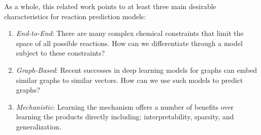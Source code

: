 As a whole, this related work points to at least three main desirable characteristics for reaction prediction models: 
\begin{enumerate}
\item \emph{End-to-End}: There are many complex chemical constraints that limit the space of all possible reactions. How can we differentiate through a model subject to these constraints?
\item \emph{Graph-Based}: Recent successes in deep learning models for graphs can embed similar graphs to similar vectors. How can we use such models to predict graphs?
\item \emph{Mechanistic}: Learning the mechanism offers a number of benefits over learning the products directly including: interpretability, sparsity, and generalization.
\end{enumerate}





